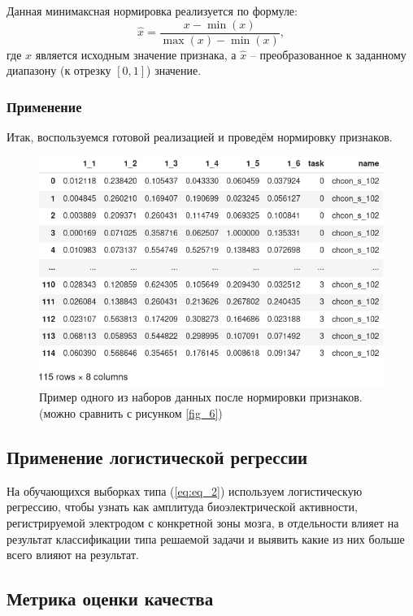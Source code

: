 Данная минимаксная нормировка реализуется по формуле:
\begin{equation*}
    \hat{x}=\frac{x-\min(x)}{\max(x)-{\min(x)}},
\end{equation*}
где $x$ является исходным значение признака, а $\hat{x}$ -- преобразованное к заданному диапазону (к отрезку
$[0, 1]$) значение.

\subsubsection{Применение}

Итак, воспользуемся готовой реализацией и проведём нормировку признаков.

\begin{figure}[H]
    \centering
    \includegraphics[width=\linewidth]{images/10.png}
    \caption{Пример одного из наборов данных после нормировки признаков. (можно сравнить
    с рисунком \ref{fig_6})}
    \label{fig_10}
\end{figure}

\subsection{Применение логистической регрессии}

На обучающихся выборках типа (\ref{eq:eq_2}) используем логистическую регрессию, чтобы
узнать как амплитуда биоэлектрической активности, регистрируемой электродом с конкретной
зоны мозга, в отдельности влияет на результат классификации типа решаемой задачи и выявить
какие из них больше всего влияют на результат.

\subsection{Метрика оценки качества}


